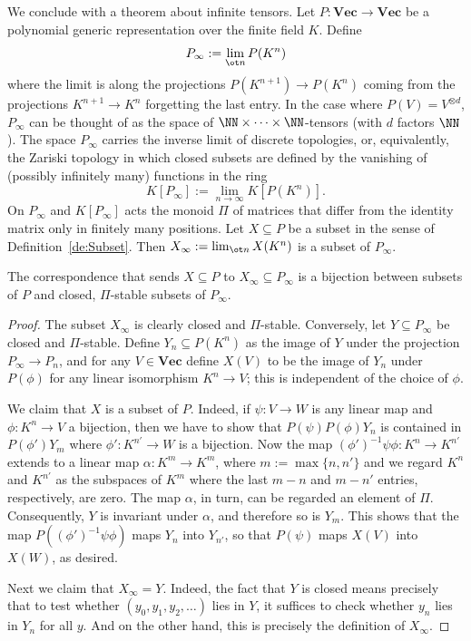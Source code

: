 \documentclass{amsart}
\renewcommand{\Vec}{\mathbf{Vec}}
\begin{document}
We conclude with a theorem about infinite tensors. 
Let $P:\Vec \to \Vec$ be a polynomial generic representation
over the finite field $K$. Define 
\[ P_{\infty}:=\lim_{\ot n} P(K^n) \]
where the limit is along the projections $P(K^{n+1}) \to P(K^n)$ coming
from the projections $K^{n+1} \to K^n$ forgetting the last entry. In the
case where $P(V)=V^{\otimes d}$, $P_\infty$ can be thought of as the space
of $\NN \times \cdots \times \NN$-tensors (with $d$ factors $\NN$). The
space $P_\infty$ carries the inverse limit of discrete topologies, or,
equivalently, the Zariski topology in which closed subsets are defined
by the vanishing of (possibly infinitely many) functions in the ring
\[ K[P_\infty]:=\lim_{n \to \infty} K[P(K^n)]. \]
On $P_\infty$ and $K[P_\infty]$ acts the monoid $\Pi$ of matrices
that differ from the identity matrix only in finitely many
positions. Let $X \subseteq P$ be a subset in the sense of
Definition~\ref{de:Subset}. Then $X_\infty:=\lim_{\ot n} X(K^n)$ is a
subset of $P_\infty$. 

\begin{prop}
The correspondence that sends $X \subseteq P$ to $X_\infty \subseteq
P_\infty$ is a bijection between subsets of $P$ and closed, $\Pi$-stable
subsets of $P_\infty$.
\end{prop}

\begin{proof}
The subset $X_\infty$ is clearly closed and $\Pi$-stable.  Conversely,
let $Y \subseteq P_\infty$ be closed and $\Pi$-stable.  Define $Y_n
\subseteq P(K^n)$ as the image of $Y$ under the projection $P_\infty \to
P_n$, and for any $V \in \Vec$ define $X(V)$ to be the image of $Y_n$
under $P(\phi)$ for any linear isomorphism $K^n \to V$; this
is independent of the choice of $\phi$.

We claim that $X$ is a subset of $P$. Indeed, if $\psi:V \to W$
is any linear map and $\phi:K^n \to V$ a bijection, then we have to
show that $P(\psi)P(\phi)Y_n$ is contained in $P(\phi')Y_{m}$ where
$\phi':K^{n'} \to W$ is a bijection.  Now the map $(\phi')^{-1} \psi
\phi: K^n \to K^{n'}$ extends to a linear map $\alpha:K^m \to K^m$, where
$m:=\max\{n,n'\}$ and we regard $K^n$ and $K^{n'}$ as the subspaces of
$K^m$ where the last $m-n$ and $m-n'$ entries, respectively, are zero. The
map $\alpha$, in turn, can be regarded an element of $\Pi$. Consequently,
$Y$ is invariant under $\alpha$, and therefore so is $Y_m$. This shows
that the map $P((\phi')^{-1} \psi \phi)$ maps $Y_n$ into $Y_{n'}$, so that
$P(\psi)$ maps $X(V)$ into $X(W)$, as desired.

Next we claim that $X_\infty=Y$. Indeed, the fact that $Y$ is closed
means precisely that to test whether $(y_0,y_1,y_2,\ldots)$ lies in $Y$,
it suffices to check whether $y_n$ lies in $Y_n$ for all $y$. And on
the other hand, this is precisely the definition of $X_\infty$.
\end{proof}
\end{document}
